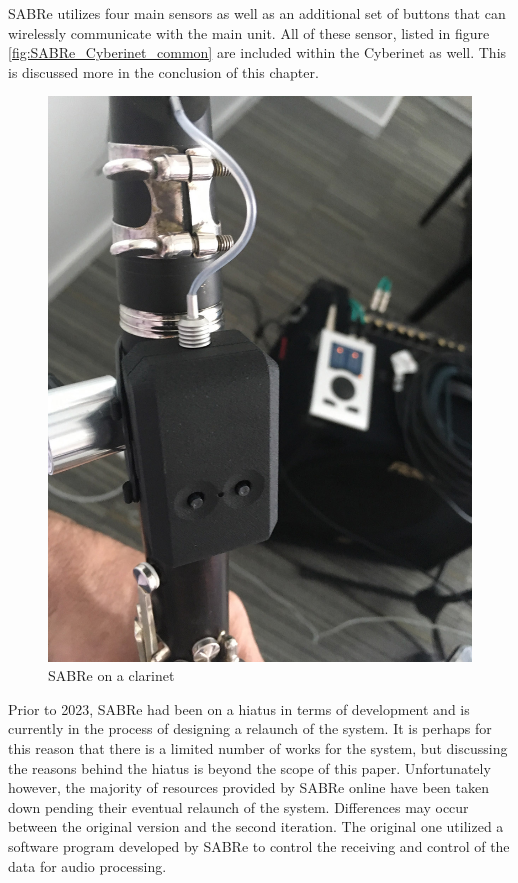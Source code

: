 SABRe utilizes four main sensors as well as an additional set of buttons that can wirelessly communicate with the main unit. All of these sensor, listed in figure \ref{fig:SABRe_Cyberinet_common} are included within the Cyberinet as well. This is discussed more in the conclusion of this chapter.
\begin{figure}
    \centering
    \includegraphics[scale=0.2]{diagrams/sabre-right-hand.jpg}
    \caption{SABRe on a clarinet}
    \label{fig:SABRe}
\end{figure}

Prior to 2023, SABRe had been on a hiatus in terms of development and is currently in the process of designing a relaunch of the system. It is perhaps for this reason that there is a limited number of works for the system, but discussing the reasons behind the hiatus is beyond the scope of this paper. Unfortunately however, the majority of resources provided by SABRe online have been taken down pending their eventual relaunch of the system. Differences may occur between the original version and the second iteration. The original one utilized a software program developed by SABRe to control the receiving and control of the data for audio processing. 

